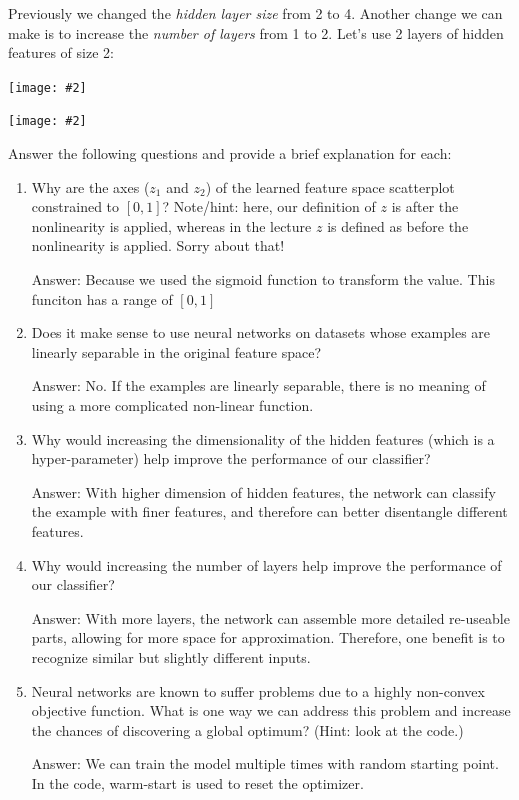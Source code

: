 \documentclass{article}
\newcommand{\blu}[1]{{\textcolor{blu}{#1}}}
\newenvironment{answer}{\par\begingroup\color{gre}Answer: }{\endgroup}
\let\ask\blu
\newcommand{\centerfig}[2]{\begin{center}\texttt{[image: \#2]}\end{center}}
\begin{document}
Previously we changed the \emph{hidden layer size} from 2 to 4. Another change we can make is to increase the \emph{number of layers} from 1 to 2. Let's use 2 layers of hidden features of size 2:

\centerfig{.7}{./figs/sinusoids_decision_boundary_[2, 2]_2.png}
\centerfig{.7}{./figs/sinusoids_linear_boundary_[2, 2]_2.png}

\ask{Answer the following questions and provide a brief explanation for each:}

\begin{enumerate}
	\item Why are the axes ($z_1$ and $z_2$) of the learned feature space scatterplot constrained to $[0, 1]$? Note/hint: here, our definition of $z$ is after the nonlinearity is applied, whereas in the lecture $z$ is defined as before the nonlinearity is applied. Sorry about that!
	\begin{answer}
		Because we used the sigmoid function to transform the value. This funciton has a range of $[0, 1]$
	\end{answer}
	\item Does it make sense to use neural networks on datasets whose examples are linearly separable in the original feature space?
	\begin{answer}
		No. If the examples are linearly separable, there is no meaning of using a more complicated non-linear function.
	\end{answer}
	\item Why would increasing the dimensionality of the hidden features (which is a hyper-parameter) help improve the performance of our classifier?
	\begin{answer}
		With higher dimension of hidden features, the network can classify the example with finer features, and therefore can better disentangle different features. 
	\end{answer}
	\item Why would increasing the number of layers help improve the performance of our classifier?
	\begin{answer}
		With more layers, the network can assemble more detailed re-useable parts, allowing for more space for approximation. Therefore, one benefit is to recognize similar but slightly different inputs.
	\end{answer}
	\item Neural networks are known to suffer problems due to a highly non-convex objective function. What is one way we can address this problem and increase the chances of discovering a global optimum? (Hint: look at the code.)
	\begin{answer}
		We can train the model multiple times with random starting point. In the code, warm-start is used to reset the optimizer.
	\end{answer}
\end{enumerate}
\end{document}
